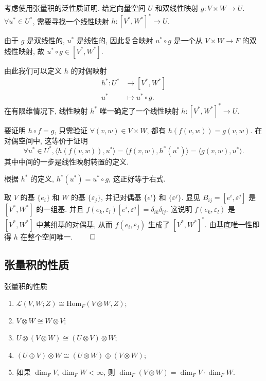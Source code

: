 考虑使用张量积的泛性质证明. 给定向量空间 $U$ 和双线性映射 $g: V \times W \to U$. $\forall u^* \in U^*$, 需要寻找一个线性映射 $h:[V^*,W^*]^* \to U$.

由于 $g$ 是双线性的, $u^*$ 是线性的, 因此复合映射 $u^* \circ g$ 是一个从 $V \times W \to F$ 的双线性映射, 故 $u^* \circ g \in [V^*,W^*]$.

由此我们可以定义 $h$ 的对偶映射 
\begin{align*}
    h^*:U^* &\to [V^*,W^*]\\ 
    u^* &\mapsto u^* \circ g.
\end{align*} 
在有限维情况下, 线性映射 $h^*$ 唯一确定了一个线性映射 $h:[V^*,W^*]^* \to U$.

要证明 $h \circ f = g$, 只需验证 $\forall (v,w) \in V \times W$, 都有 $h(f(v,w)) = g(v,w)$. 在对偶空间中, 这等价于证明 
\begin{equation*}
    \forall u^* \in U^*, \langle h(f(v,w)), u^* \rangle = \langle f(v,w), h^*(u^*) \rangle = \langle g(v,w), u^* \rangle.
\end{equation*}
其中中间的一步是线性映射转置的定义.

根据 $h^*$ 的定义, $h^*(u^*) = u^* \circ g$, 这正好等于右式.

取 $V$ 的基 $\{e_i\}$ 和 $W$ 的基 $\{\varepsilon_j\}$, 并记对偶基 $\{e^i\}$ 和 $\{\varepsilon^j\}$. 显见 $B_{ij} = [e^i,\varepsilon^j]$ 是 $[V^*,W^*]$ 的一组基. 并且 $f(e_k,\varepsilon_l)[e^i,\varepsilon^j] = \delta_{ik}\delta_{lj}$. 这说明 $f(e_k,\varepsilon_l)$ 是 $[V^*,W^*]$ 中某组基的对偶基, 从而 $f(e_i,\varepsilon_j)$ 生成了 $[V^*,W^*]^*$. 由基底唯一性即得 $h$ 在整个空间唯一. \hfill\(\qed\)


\subsection{张量积的性质}

\begin{theorem}
    张量积的性质

    \vspace{-1em}
    \begin{enumerate}
        \item[(1)] $\mathcal{L} (V,W;Z) \cong \text{Hom}_F(V \otimes W,Z)$;
        \item[(2)] $V \otimes W \cong W \otimes V$;
        \item[(3)] $U \otimes (V \otimes W) \cong (U \otimes V) \otimes W$;
        \item[(4)] $(U \oplus V) \otimes W \cong (U \otimes W) \oplus (V \otimes W)$;
        \item[(5)] 如果 $\dim_FV,\dim_FW<\infty$, 则 $\dim_F(V \otimes W) = \dim_FV \cdot \dim_FW$.
    \end{enumerate}
\end{theorem}

